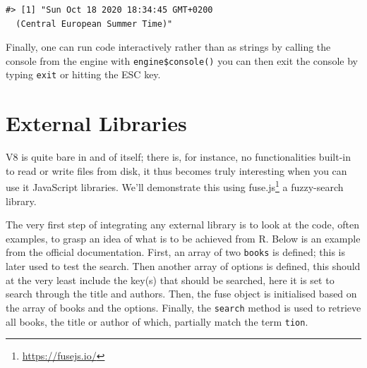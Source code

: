 \documentclass[10pt,]{krantz}
\makeatletter
\newenvironment{Shaded}{\begin{snugshade}}{\end{snugshade}}
\newcommand{\CommentTok}[1]{\textcolor[rgb]{0.37,0.37,0.37}{\textit{#1}}}
\newcommand{\KeywordTok}[1]{\textcolor[rgb]{0.27,0.27,0.27}{\textbf{#1}}}
\newcommand{\NormalTok}[1]{#1}
\newcommand{\OperatorTok}[1]{\textcolor[rgb]{0.43,0.43,0.43}{\textbf{#1}}}
\newcommand{\StringTok}[1]{\textcolor[rgb]{0.5,0.5,0.5}{#1}}
\renewcommand{\href}[2]{#2\footnote{\url{#1}}}
\newenvironment{kframe}{%
\medskip{}
\setlength{\fboxsep}{.8em}
 \def\at@end@of@kframe{}%
 \ifinner\ifhmode%
  \def\at@end@of@kframe{\end{minipage}}%
  \begin{minipage}{\columnwidth}%
 \fi\fi%
 \def\FrameCommand##1{\hskip\@totalleftmargin \hskip-\fboxsep
 \colorbox{shadecolor}{##1}\hskip-\fboxsep
     \hskip-\linewidth \hskip-\@totalleftmargin \hskip\columnwidth}%
 \MakeFramed {\advance\hsize-\width
   \@totalleftmargin\z@ \linewidth\hsize
   \@setminipage}}%
 {\par\unskip\endMakeFramed%
 \at@end@of@kframe}
\renewenvironment{Shaded}{\begin{kframe}}{\end{kframe}}
\makeatother
\begin{document}
\begin{Shaded}
\end{Shaded}

\begin{verbatim}
#> [1] "Sun Oct 18 2020 18:34:45 GMT+0200 
  (Central European Summer Time)"
\end{verbatim}

Finally, one can run code interactively rather than as strings by calling the console from the engine with \texttt{engine\$console()} you can then exit the console by typing \texttt{exit} or hitting the ESC key.

\hypertarget{v8-external}{%
\section{External Libraries}\label{v8-external}}

V8 is quite bare in and of itself; there is, for instance, no functionalities built-in to read or write files from disk, it thus becomes truly interesting when you can use it JavaScript libraries. We'll demonstrate this using \href{https://fusejs.io/}{fuse.js} a fuzzy-search library.

The very first step of integrating any external library is to look at the code, often examples, to grasp an idea of what is to be achieved from R. Below is an example from the official documentation. First, an array of two \texttt{books} is defined; this is later used to test the search. Then another array of options is defined, this should at the very least include the key(s) that should be searched, here it is set to search through the title and authors. Then, the fuse object is initialised based on the array of books and the options. Finally, the \texttt{search} method is used to retrieve all books, the title or author of which, partially match the term \texttt{tion}.
\end{document}
